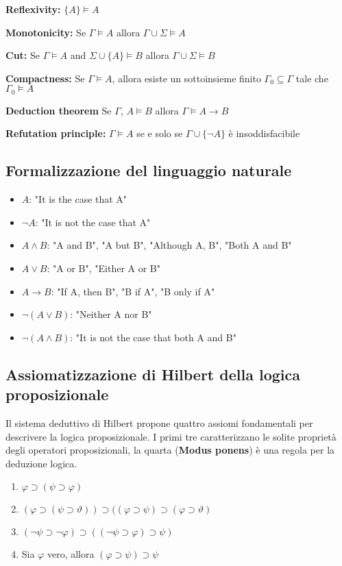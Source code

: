 \textbf{Reflexivity:} $\lbrace A \rbrace \models A$

\textbf{Monotonicity:} Se $\Gamma \models A$ allora $\Gamma \cup \Sigma \models A$

\textbf{Cut:} Se $\Gamma \models A$ and $\Sigma \cup \lbrace A \rbrace \models B$ allora $\Gamma \cup \Sigma \models B$

\textbf{Compactness:} Se $\Gamma \models A$, allora esiste un sottoinsieme finito $\Gamma_0 \subseteq \Gamma$ tale che $\Gamma_0 \models A$

\textbf{Deduction theorem} Se $\Gamma$, $A \models B$ allora $\Gamma \models A \to B$

\textbf{Refutation principle:} $\Gamma \models A$ se e solo se $\Gamma \cup \lbrace \lnot A \rbrace$ è insoddisfacibile

\subsection{Formalizzazione del linguaggio naturale}

\begin{itemize}
\item $A$: "It is the case that A"
\item $\lnot A$: "It is not the case that A"
\item $A \land B$: "A and B", "A but B", "Although A, B", "Both A and B"
\item $A \lor B$: "A or B", "Either A or B"
\item $A \to B$: "If A, then B", "B if A", "B only if A"
\item $\lnot (A \lor B)$: "Neither A nor B"
\item $\lnot (A \land B)$: "It is not the case that both A and B"
\end{itemize}

\subsection{Assiomatizzazione di Hilbert della logica proposizionale}
Il sistema deduttivo di Hilbert propone quattro assiomi fondamentali per descrivere la logica proposizionale. I primi tre caratterizzano le solite proprietà degli operatori proposizionali, la quarta (\textbf{Modus ponens}) è una regola per la deduzione logica.
\begin{enumerate}
\item $\varphi \supset (\psi \supset \varphi)$
\item $(\varphi \supset (\psi \supset \vartheta) ) \supset ((\varphi \supset \psi) \supset (\varphi \supset \vartheta) $
\item $(\lnot \psi \supset \lnot \varphi) \supset ((\lnot \psi \supset \varphi ) \supset \psi )$
\item Sia $\varphi$ vero, allora $(\varphi \supset \psi) \supset \psi$
\end{enumerate}

